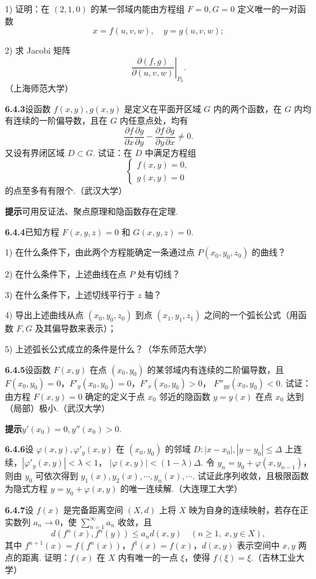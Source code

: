 \documentclass[UTF8, 12pt, fontset=fandol, oneside]{ctexart}
\begin{document}
1) 证明：在 $(2,1,0)$ 的某一邻域内能由方程组 $F=0,G=0$ 定义唯一的一对函数
\[
  x=f(u,v,w),\quad y=g(u,v,w);
\]

2) 求 Jacobi 矩阵
\[
  \left.\frac{\partial(f,g)}{\partial(u,v,w)}\right|_{P_0}.
\]
（上海师范大学）

\noindent\textbf{6.4.3}\quad 设函数 $f(x,y),g(x,y)$ 是定义在平面开区域 $G$ 内的两个函数，在 $G$ 内均有连续的一阶偏导数，且在 $G$ 内任意点处，均有
\[
  \frac{\partial f}{\partial x}\frac{\partial g}{\partial y}
  -
  \frac{\partial f}{\partial y}\frac{\partial g}{\partial x}
  \ne0.
\]
又设有界闭区域 $D\subset G$. 试证：在 $D$ 中满足方程组
\[
\begin{cases}
  f(x,y)=0,\\
  g(x,y)=0
\end{cases}
\]
的点至多有有限个.（武汉大学）

\noindent\textbf{提示}\quad 可用反证法、聚点原理和隐函数存在定理.

\noindent\textbf{6.4.4}\quad 已知方程 $F(x,y,z)=0$ 和 $G(x,y,z)=0$.

1) 在什么条件下，由此两个方程能确定一条通过点 $P(x_0,y_0,z_0)$ 的曲线？

2) 在什么条件下，上述曲线在点 $P$ 处有切线？

3) 在什么条件下，上述切线平行于 $z$ 轴？

4) 导出上述曲线从点 $(x_0,y_0,z_0)$ 到点 $(x_1,y_1,z_1)$ 之间的一个弧长公式（用函数 $F,G$ 及其偏导数来表示）；

5) 上述弧长公式成立的条件是什么？（华东师范大学）

\noindent\textbf{6.4.5}\quad 设函数 $F(x,y)$ 在点 $(x_0,y_0)$ 的某邻域内有连续的二阶偏导数，且
$F(x_0,y_0)=0$，$F'_y(x_0,y_0)=0$，$F'_x(x_0,y_0)>0$，
$F''_{yy}(x_0,y_0)<0$. 试证：由方程 $F(x,y)=0$ 确定的定义于点 $x_0$ 邻近的隐函数
$y=y(x)$ 在点 $x_0$ 达到（局部）极小.（武汉大学）

\noindent\textbf{提示}\quad $y'(x_0)=0,y''(x_0)>0$.

\noindent\textbf{6.4.6}\quad 设 $\varphi(x,y),\varphi'_y(x,y)$ 在 $(x_0,y_0)$ 的邻域
$D: |x-x_0|, |y-y_0|\le\Delta$ 上连续，$|\varphi'_y(x,y)|<\lambda<1$，
$|\varphi(x,y)|<(1-\lambda)\Delta$. 令
$y_n=y_0+\varphi(x,y_{n-1})$，则由 $y_0$ 可依次得到
$y_1(x),y_2(x),\cdots,y_n(x),\cdots$. 试证此序列收敛，且极限函数为隐式方程
$y=y_0+\varphi(x,y)$ 的唯一连续解.（大连理工大学）

\noindent\textbf{6.4.7}\quad 设 $f(x)$ 是完备距离空间 $(X,d)$ 上将 $X$ 映为自身的连续映射，若存在正实数列 $a_n\to0$，使
$\sum_{n=1}^\infty a_n$ 收敛，且
\[
  d(f^n(x),f^n(y))\le a_n d(x,y)\quad(n\ge1,\ x,y\in X),
\]
其中 $f^{n+1}(x)=f(f^n(x))$，$f^1(x)=f(x)$，$d(x,y)$ 表示空间中 $x,y$ 两点的距离. 证明：$f(x)$ 在 $X$ 内有唯一的一点 $\xi$，使得 $f(\xi)=\xi$.（吉林工业大学）
\end{document}
